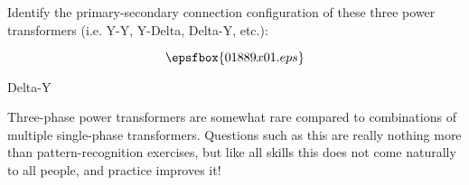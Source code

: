 

Identify the primary-secondary connection configuration of these three power transformers (i.e. Y-Y, Y-Delta, Delta-Y, etc.):

$$\epsfbox{01889x01.eps}$$







Delta-Y







Three-phase power transformers are somewhat rare compared to combinations of multiple single-phase transformers.  Questions such as this are really nothing more than pattern-recognition exercises, but like all skills this does not come naturally to all people, and practice improves it!




